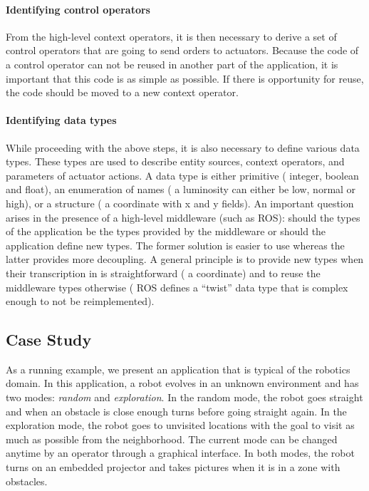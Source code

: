 \paragraph*{Identifying control operators}
From the high-level context operators, it is then necessary to derive
a set of control operators that are going to send orders to actuators.
Because the code of a control operator can not be reused in another
part of the application, it is important that this code is as simple
as possible. If there is opportunity for reuse, the code should be
moved to a new context operator. 

\paragraph*{Identifying data types}
While proceeding with the above steps, it is also necessary to define
various data types. These types are used to describe entity sources,
context operators, and parameters of actuator actions. A data type is
either primitive (\eg{} integer, boolean and float), an enumeration of
names (\eg{} a luminosity can either be low, normal or high), or a
structure (\eg{} a coordinate with x and y fields). An important
question arises in the presence of a high-level middleware (such as
ROS): should the types of the application be the types provided by the
middleware or should the application define new types. The former
solution is easier to use whereas the latter provides more decoupling.
A general principle is to provide new types when their transcription
in \diaspec{} is straightforward (\eg{} a coordinate) and to reuse the
middleware types otherwise (\eg{} ROS defines a ``twist'' data type
that is complex enough to not be reimplemented).

\subsection{Case Study}

As a running example, we present an application that is typical of the
robotics domain. In this application, a robot evolves in an unknown
environment and has two modes: \emph{random} and \emph{exploration}.
In the random mode, the robot goes straight and when an obstacle is
close enough turns before going straight again. In the exploration
mode, the robot goes to unvisited locations with the goal to visit as
much as possible from the neighborhood. The current mode can be
changed anytime by an operator through a graphical interface. In both
modes, the robot turns on an embedded projector and takes pictures
when it is in a zone with obstacles.

